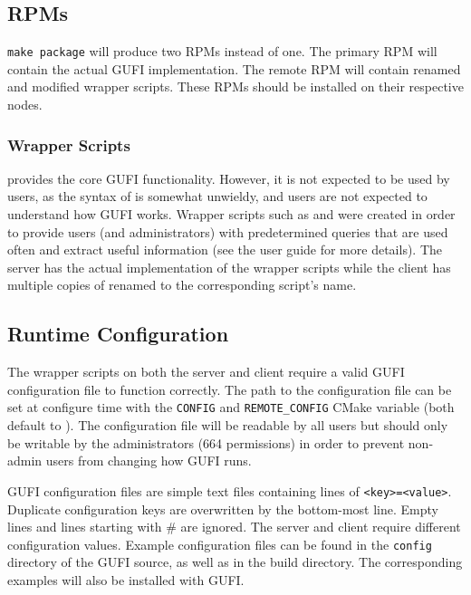 \subsection{RPMs}
\texttt{make~package} will produce two RPMs instead of one. The
primary RPM will contain the actual GUFI implementation. The remote
RPM will contain renamed and modified \gufiremote wrapper
scripts. These RPMs should be installed on their respective nodes.

\subsubsection{Wrapper Scripts}
\gufiquery provides the core GUFI functionality. However, it is not
expected to be used by users, as the syntax of \gufiquery is somewhat
unwieldy, and users are not expected to understand how GUFI
works. Wrapper scripts such as \gufifind and \gufils were created in
order to provide users (and administrators) with predetermined queries
that are used often and extract useful information (see the user guide
for more details). The server has the actual implementation of the
wrapper scripts while the client has multiple copies of \gufiremote
renamed to the corresponding script's name.

\subsection{Runtime Configuration}
The wrapper scripts on both the server and client require a valid GUFI
configuration file to function correctly. The path to the
configuration file can be set at configure time with the
\texttt{CONFIG} and \texttt{REMOTE\_CONFIG} CMake
variable (both default to \guficonfigfile). The configuration file
will be readable by all users but should only be writable by the
administrators (664 permissions) in order to prevent non-admin users
from changing how GUFI runs.

GUFI configuration files are simple text files containing lines of
\texttt{<key>=<value>}. Duplicate configuration keys are overwritten
by the bottom-most line. Empty lines and lines starting with \# are
ignored. The server and client require different configuration
values. Example configuration files can be found in the
\texttt{config} directory of the GUFI source, as well as in the build
directory. The corresponding examples will also be installed with
GUFI.

